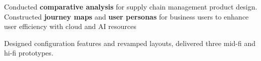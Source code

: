       \vspace{-1.0mm}
      \resumeItemListStart
      \item Conducted \textbf{comparative analysis} for supply chain management product design. Constructed \textbf{journey maps} and \textbf{user personas} for business users to enhance user efficiency with cloud and AI resources
      \item Designed configuration features and revamped layouts, delivered three mid-fi and hi-fi prototypes.
    \resumeItemListEnd
    \vspace{-3mm}

  
  \resumeSubHeadingListEnd
\vspace{-5.5mm}
